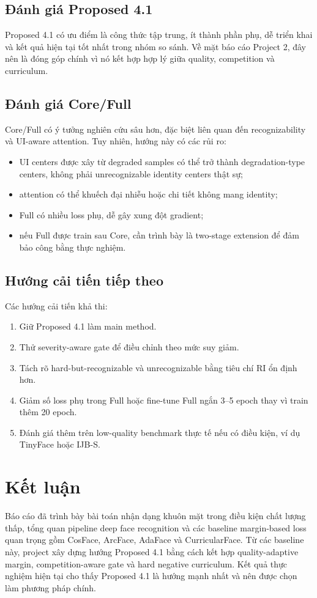 \documentclass[13pt,a4paper]{extreport}
\begin{document}
\section{Đánh giá Proposed 4.1}
Proposed 4.1 có ưu điểm là công thức tập trung, ít thành phần phụ, dễ triển khai và kết quả hiện tại tốt nhất trong nhóm so sánh. Về mặt báo cáo Project 2, đây nên là đóng góp chính vì nó kết hợp hợp lý giữa quality, competition và curriculum.

\section{Đánh giá Core/Full}
Core/Full có ý tưởng nghiên cứu sâu hơn, đặc biệt liên quan đến recognizability và UI-aware attention. Tuy nhiên, hướng này có các rủi ro:
\begin{itemize}[leftmargin=1.2cm]
    \item UI centers được xây từ degraded samples có thể trở thành degradation-type centers, không phải unrecognizable identity centers thật sự;
    \item attention có thể khuếch đại nhiễu hoặc chi tiết không mang identity;
    \item Full có nhiều loss phụ, dễ gây xung đột gradient;
    \item nếu Full được train sau Core, cần trình bày là two-stage extension để đảm bảo công bằng thực nghiệm.
\end{itemize}

\section{Hướng cải tiến tiếp theo}
Các hướng cải tiến khả thi:
\begin{enumerate}[leftmargin=1.2cm]
    \item Giữ Proposed 4.1 làm main method.
    \item Thử severity-aware gate để điều chỉnh theo mức suy giảm.
    \item Tách rõ hard-but-recognizable và unrecognizable bằng tiêu chí RI ổn định hơn.
    \item Giảm số loss phụ trong Full hoặc fine-tune Full ngắn 3--5 epoch thay vì train thêm 20 epoch.
    \item Đánh giá thêm trên low-quality benchmark thực tế nếu có điều kiện, ví dụ TinyFace hoặc IJB-S.
\end{enumerate}

\chapter{Kết luận}
Báo cáo đã trình bày bài toán nhận dạng khuôn mặt trong điều kiện chất lượng thấp, tổng quan pipeline deep face recognition và các baseline margin-based loss quan trọng gồm CosFace, ArcFace, AdaFace và CurricularFace. Từ các baseline này, project xây dựng hướng Proposed 4.1 bằng cách kết hợp quality-adaptive margin, competition-aware gate và hard negative curriculum. Kết quả thực nghiệm hiện tại cho thấy Proposed 4.1 là hướng mạnh nhất và nên được chọn làm phương pháp chính.
\end{document}
